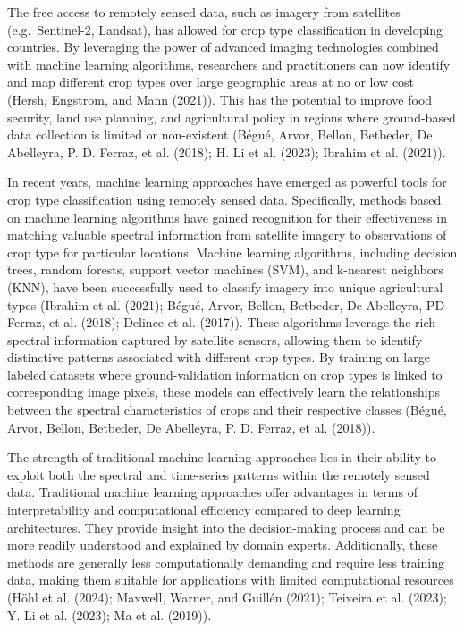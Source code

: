 \documentclass[
]{article}
\begin{document}
The free access to remotely sensed data, such as imagery from satellites
(e.g.~Sentinel-2, Landsat), has allowed for crop type classification in
developing countries. By leveraging the power of advanced imaging
technologies combined with machine learning algorithms, researchers and
practitioners can now identify and map different crop types over large
geographic areas at no or low cost (Hersh, Engstrom, and Mann (2021)).
This has the potential to improve food security, land use planning, and
agricultural policy in regions where ground-based data collection is
limited or non-existent (Bégué, Arvor, Bellon, Betbeder, De Abelleyra,
P. D. Ferraz, et al. (2018); H. Li et al. (2023); Ibrahim et al.
(2021)).

In recent years, machine learning approaches have emerged as powerful
tools for crop type classification using remotely sensed data.
Specifically, methods based on machine learning algorithms have gained
recognition for their effectiveness in matching valuable spectral
information from satellite imagery to observations of crop type for
particular locations. Machine learning algorithms, including decision
trees, random forests, support vector machines (SVM), and k-nearest
neighbors (KNN), have been successfully used to classify imagery into
unique agricultural types (Ibrahim et al. (2021); Bégué, Arvor, Bellon,
Betbeder, De Abelleyra, PD Ferraz, et al. (2018); Delince et al.
(2017)). These algorithms leverage the rich spectral information
captured by satellite sensors, allowing them to identify distinctive
patterns associated with different crop types. By training on large
labeled datasets where ground-validation information on crop types is
linked to corresponding image pixels, these models can effectively learn
the relationships between the spectral characteristics of crops and
their respective classes (Bégué, Arvor, Bellon, Betbeder, De Abelleyra,
P. D. Ferraz, et al. (2018)).

The strength of traditional machine learning approaches lies in their
ability to exploit both the spectral and time-series patterns within the
remotely sensed data. Traditional machine learning approaches offer
advantages in terms of interpretability and computational efficiency
compared to deep learning architectures. They provide insight into the
decision-making process and can be more readily understood and explained
by domain experts. Additionally, these methods are generally less
computationally demanding and require less training data, making them
suitable for applications with limited computational resources (Höhl et
al. (2024); Maxwell, Warner, and Guillén (2021); Teixeira et al. (2023);
Y. Li et al. (2023); Ma et al. (2019)).
\end{document}

